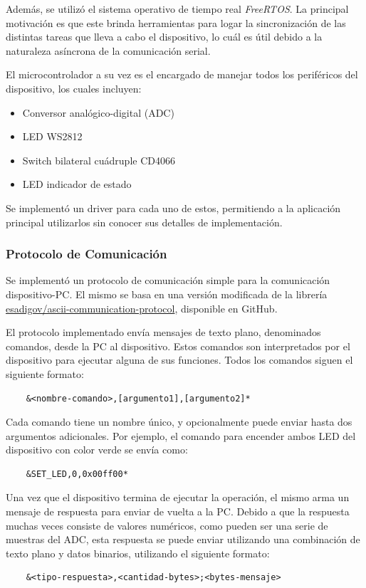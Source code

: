 \documentclass[12pt,a4paper,fleqn]{article}
\begin{document}
Además, se utilizó el sistema operativo de tiempo real \textit{FreeRTOS}. La principal motivación es que este brinda herramientas para logar la sincronización de las distintas tareas que lleva a cabo el dispositivo, lo cuál es útil debido a la naturaleza asíncrona de la comunicación serial.

El microcontrolador a su vez es el encargado de manejar todos los periféricos del dispositivo, los cuales incluyen:
\begin{itemize}
    \item Conversor analógico-digital (ADC)
    \item LED WS2812
    \item Switch bilateral cuádruple CD4066
    \item LED indicador de estado
\end{itemize}
%
Se implementó un driver para cada uno de estos, permitiendo a la aplicación principal utilizarlos sin conocer sus detalles de implementación. 

\subsubsection{Protocolo de Comunicación}

Se implementó un protocolo de comunicación simple para la comunicación dispositivo-PC. El mismo se basa en una versión modificada de la librería  \href{https://github.com/esadigov/ascii-communication-protocol}{esadigov/ascii-communication-protocol}, disponible en GitHub. 

El protocolo implementado envía mensajes de texto plano, denominados comandos, desde la PC al dispositivo. Estos comandos son interpretados por el dispositivo para ejecutar alguna de sus funciones. Todos los comandos siguen el siguiente formato:
%
\begin{verbatim}
    &<nombre-comando>,[argumento1],[argumento2]*
\end{verbatim}

Cada comando tiene un nombre único, y opcionalmente puede enviar hasta dos argumentos adicionales. Por ejemplo, el comando para encender ambos LED del dispositivo con color verde se envía como:
%
\begin{verbatim}
    &SET_LED,0,0x00ff00*
\end{verbatim}

Una vez que el dispositivo termina de ejecutar la operación, el mismo arma un mensaje de respuesta para enviar de vuelta a la PC. Debido a que la respuesta muchas veces consiste de valores numéricos, como pueden ser una serie de muestras del ADC, esta respuesta se puede enviar utilizando una combinación de texto plano y datos binarios, utilizando el siguiente formato:
%
\begin{verbatim}
    &<tipo-respuesta>,<cantidad-bytes>;<bytes-mensaje>
\end{verbatim}
\end{document}
